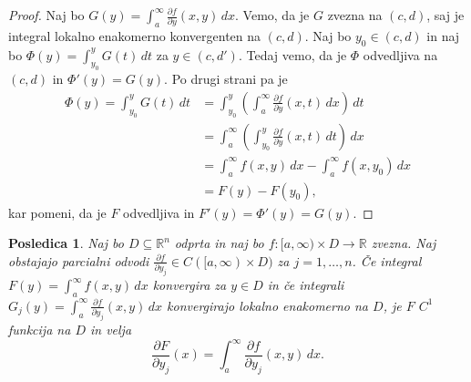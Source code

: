 \documentclass[10pt, a4paper]{article}
\newtheorem{posledica}[izr]{Posledica}
\newenvironment{noticeC}{%
  \tcolorbox[%
  notitle,
  empty,
  enhanced,  %
  breakable,
  coltext=black, 
  fontupper=\rmfamily,
  parbox=false,
  noparskip,
  sharp corners,
  boxrule=-1pt,  %
  frame hidden,
  left=7pt,  %
  right=7pt,
  top=5pt,
  bottom=5pt,
  before skip=2.5ex plus 2pt,
  after skip=2.5ex plus 2pt,
  overlay unbroken and last={%
  },
  ]}
{\endtcolorbox}
\newenvironment{dokaz}%
  {\begin{noticeC}\begin{proof}}%
  {\end{proof}\end{noticeC}}
\newcommand{\R}{\mathbb {R}}
\begin{document}
\begin{dokaz}
    Naj bo $G(y) = \int_a ^\infty \frac{\partial f}{\partial y} (x, y)\, dx$. 
    Vemo, da je $G$ zvezna na $(c, d)$, saj je integral lokalno enakomerno konvergenten 
    na $(c, d)$. Naj bo $y_0 \in (c, d)$ in naj bo $\Phi (y) = \int_{y_0} ^y G(t)\, dt$
    za $y \in (c, d')$. Tedaj vemo, da je $\Phi$ odvedljiva na $(c, d)$ in $\Phi'(y) = G(y)$.
    Po drugi strani pa je 
    \begin{align*}
        \Phi (y) = \int_{y_0} ^y G(t)\, dt &= \int_{y_0} ^y \left(\int_a ^\infty \frac{\partial f}{\partial y}(x, t)\, dx\right)\, dt\\
        &= \int_a ^\infty \left(\int_{y_0} ^y \frac{\partial f}{\partial y}(x, t)\, dt\right)\, dx\\
        &= \int_a ^\infty f(x, y)\, dx - \int_a ^\infty f(x, y_0)\, dx\\
        &= F(y) - F(y_0),
    \end{align*}
    kar pomeni, da je $F$ odvedljiva in $F'(y) = \Phi'(y) = G(y).$
\end{dokaz} 

\begin{posledica}
    Naj bo $D \subseteq \R^n$ odprta in naj bo $f: [a, \infty) \times D \to \R$ zvezna.
    Naj obstajajo parcialni odvodi $\frac{\partial f}{\partial y_j} \in C([a, \infty) \times D)$ 
    za $j = 1, \dots, n$. Če integral $F(y) = \int_a ^\infty f(x, y)\, dx$ konvergira za $y \in D$
    in če integrali $G_j (y) = \int_a ^\infty \frac{\partial f}{\partial y_j} (x, y)\, dx$ 
    konvergirajo lokalno enakomerno na $D$, je $F$ $C^1$ funkcija na $D$ in velja 
    $$\frac{\partial F}{\partial y_j} (x) = \int_a ^\infty \frac{\partial f}{\partial y_j} (x, y)\, dx.$$
\end{posledica}
\end{document}
